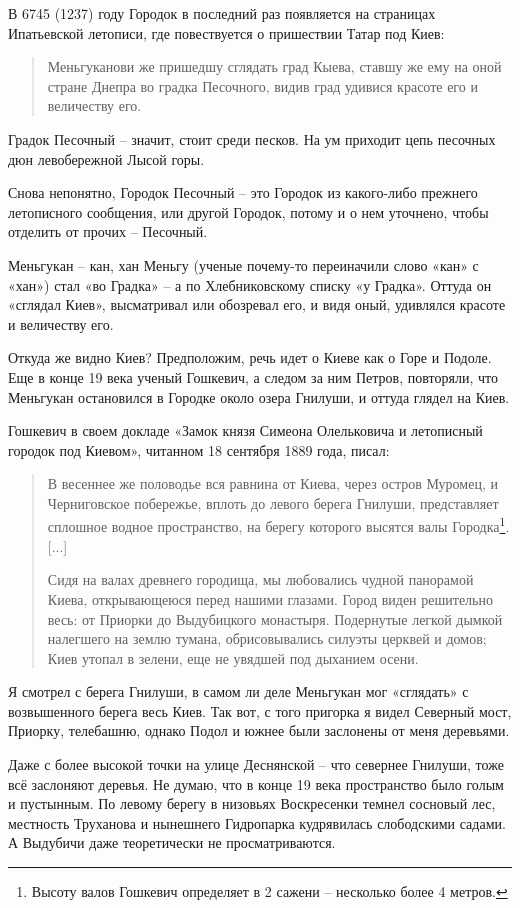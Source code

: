 В 6745 (1237) году Городок в последний раз появляется на страницах Ипатьевской летописи, где повествуется о пришествии Татар под Киев:

\begin{quotation}
Меньгуканови же пришедшу сглядать град Кыева, ставшу же ему на оной стране Днепра во градка Песочного, видив град удивися красоте его и величеству его.
\end{quotation}

Градок Песочный – значит, стоит среди песков. На ум приходит цепь песочных дюн левобережной Лысой горы.

Снова непонятно, Городок Песочный – это Городок из какого-либо прежнего летописного сообщения, или другой Городок, потому и о нем уточнено, чтобы отделить от прочих – Песочный.

Меньгукан – кан, хан Меньгу (ученые почему-то переиначили слово «кан» с «хан») стал «во Градка» – а по Хлебниковскому списку «у Градка». Оттуда он «сглядал Киев», высматривал или обозревал его, и видя оный, удивлялся красоте и величеству его.

Откуда же видно Киев? Предположим, речь идет о Киеве как о Горе и Подоле. Еще в конце 19 века ученый Гошкевич, а следом за ним Петров, повторяли, что Меньгукан остановился в Городке около озера Гнилуши, и оттуда глядел на Киев.

Гошкевич в своем докладе «Замок князя Симеона Олельковича и летописный городок под Киевом», читанном 18 сентября 1889 года, писал:

\begin{quotation}
В весеннее же половодье вся равнина от Киева, через остров Муромец, и Черниговское побережье, вплоть до левого берега Гнилуши, представляет сплошное водное пространство, на берегу которого высятся валы Городка\footnote{Высоту валов Гошкевич определяет в 2 сажени – несколько более 4 метров.}. [...]

Сидя на валах древнего городища, мы любовались чудной панорамой Киева, открывающеюся перед нашими глазами. Город виден решительно весь: от Приорки до Выдубицкого монастыря. Подернутые легкой дымкой налегшего на землю тумана, обрисовывались силуэты церквей и домов; Киев утопал в зелени, еще не увядшей под дыханием осени.
\end{quotation}

Я смотрел с берега Гнилуши, в самом ли деле Меньгукан мог «сглядать» с возвышенного берега весь Киев. Так вот, с того пригорка я видел Северный мост, Приорку, телебашню, однако Подол и южнее были заслонены от меня деревьями.

Даже с более высокой точки на улице Деснянской  – что севернее Гнилуши, тоже всё заслоняют деревья. Не думаю, что в конце 19 века пространство было голым и пустынным. По левому берегу в низовьях Воскресенки темнел сосновый лес, местность Труханова и нынешнего Гидропарка кудрявилась слободскими садами. А Выдубичи даже теоретически не просматриваются.
